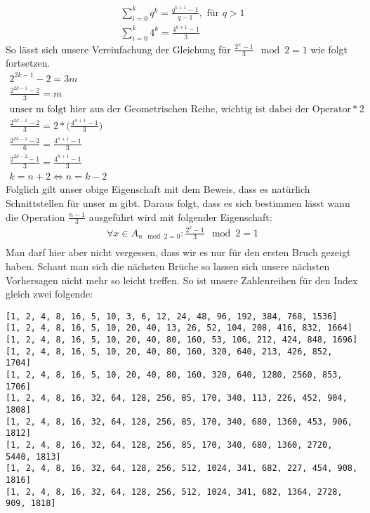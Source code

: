 \documentclass{article}
\begin{document}
\begin{gather*}
\sum_{i = 0}^{k}q^k = \frac{q^{k+1}-1}{q-1}, \text{ für } q > 1 \\
\sum_{i = 0}^{k}4^k = \frac{4^{k+1}-1}{3}
\end{gather*}
So lässt sich unsere Vereinfachung der Gleichung für $\frac{2^x-1}{3} \mod 2 = 1$ wie folgt fortsetzen.
\begin{gather*}
2^{2k-1} - 2 = 3m \\
\frac{2^{2k-1} - 2}{3} = m \\
\text {unser m folgt hier aus der Geometrischen Reihe, wichtig ist dabei der Operator} * 2 \\
\frac{2^{2k-1} - 2}{3} = 2*\big(\frac{4^{n+1}-1}{3}\big) \\
\frac{2^{2k-1} - 2}{6} = \frac{4^{n+1}-1}{3} \\
\frac{2^{2k-2} - 1}{3} = \frac{4^{n+1}-1}{3} \\
k = n + 2 \Leftrightarrow n = k - 2
\end{gather*}
\noindent Folglich gilt unser obige Eigenschaft mit dem Beweis, dass es natürlich Schnittstellen für unser m gibt. Daraus folgt, dass es sich bestimmen lässt wann die Operation $\frac{n-1}{3}$ ausgeführt wird mit folgender Eigenschaft:
\begin{gather*}
\forall x \in A_{n \mod 2 = 0}: \frac{2^{x}-1}{3} \mod 2 = 1 \\
\end{gather*}
Man darf hier aber nicht vergessen, dass wir es nur für den ersten Bruch gezeigt haben. Schaut man sich die nächsten Brüche so lassen sich unsere nächsten Vorhersagen nicht mehr so leicht treffen. So ist unsere Zahlenreihen für den Index gleich zwei folgende:
\begin{verbatim}
[1, 2, 4, 8, 16, 5, 10, 3, 6, 12, 24, 48, 96, 192, 384, 768, 1536]
[1, 2, 4, 8, 16, 5, 10, 20, 40, 13, 26, 52, 104, 208, 416, 832, 1664]
[1, 2, 4, 8, 16, 5, 10, 20, 40, 80, 160, 53, 106, 212, 424, 848, 1696]
[1, 2, 4, 8, 16, 5, 10, 20, 40, 80, 160, 320, 640, 213, 426, 852, 1704]
[1, 2, 4, 8, 16, 5, 10, 20, 40, 80, 160, 320, 640, 1280, 2560, 853, 1706]
[1, 2, 4, 8, 16, 32, 64, 128, 256, 85, 170, 340, 113, 226, 452, 904, 1808]
[1, 2, 4, 8, 16, 32, 64, 128, 256, 85, 170, 340, 680, 1360, 453, 906, 1812]
[1, 2, 4, 8, 16, 32, 64, 128, 256, 85, 170, 340, 680, 1360, 2720, 5440, 1813]
[1, 2, 4, 8, 16, 32, 64, 128, 256, 512, 1024, 341, 682, 227, 454, 908, 1816]
[1, 2, 4, 8, 16, 32, 64, 128, 256, 512, 1024, 341, 682, 1364, 2728, 909, 1818]
\end{verbatim}
\end{document}
